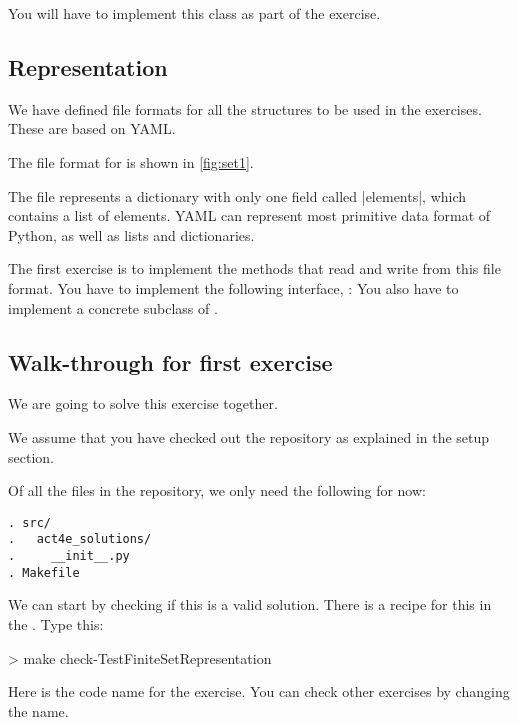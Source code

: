You will have to implement this class as part of the exercise.


\subsection*{Representation}

We have defined file formats for all the structures to be used in the exercises.
These are based on YAML\@.


The file format for  is shown in \cref{fig:set1}.


The file represents a dictionary with only one field called \pystr|elements|, which contains a list of elements.
YAML can represent most primitive data format of Python, as well as lists and dictionaries.

\begin{exercise}
  \label{ex:setrepr}
  The first exercise is to implement the methods that read and write from this file format.
  You have to implement the following interface, :
%
  You also have to implement a concrete subclass of .
\end{exercise}

\subsection{Walk-through for first exercise}

We are going to solve this exercise together.

We assume that you have checked out the repository as explained in the setup section.

Of all the files in the repository, we only need the following for now:

\begin{verbatim}
. src/
.   act4e_solutions/
.     __init__.py
. Makefile
\end{verbatim}


We can start by checking if this is a valid solution. There is a recipe for this in the .
Type this:

\begin{console}
  > make check-TestFiniteSetRepresentation
\end{console}

Here  is the code name for the exercise. You can check other exercises by changing the name.

